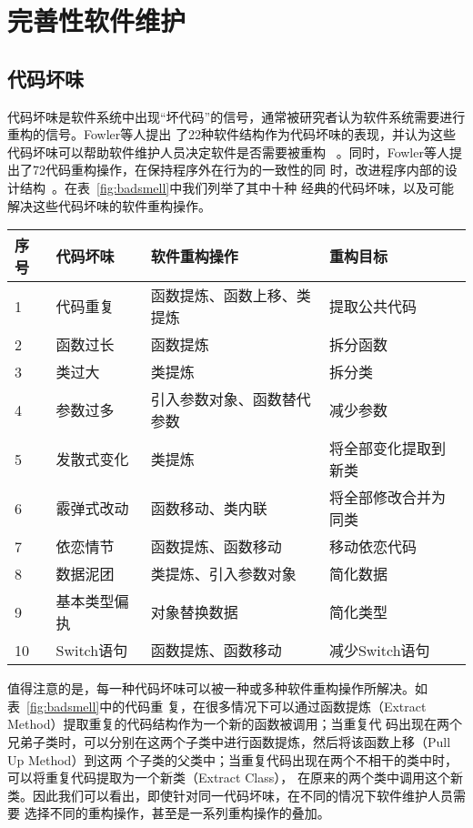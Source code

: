 \section{完善性软件维护}

\subsection{代码坏味}
代码坏味是软件系统中出现``坏代码''的信号，通常被研究者认为软件系统需要进行重构的信号。Fowler等人提出
了22种软件结构作为代码坏味的表现，并认为这些代码坏味可以帮助软件维护人员决定软件是否需要被重构
~\cite{fowler1999refactoring}。同时，Fowler等人提出了72代码重构操作，在保持程序外在行为的一致性的同
时，改进程序内部的设计结构~\cite{fowler1999refactoring}。在表~\ref{fig:badsmell}中我们列举了其中十种
经典的代码坏味，以及可能解决这些代码坏味的软件重构操作。

\begin{center}
\label{fig:badsmell}
\begin{tabular}{|l|l|l|l|}
\hline
序号 & 代码坏味 & 软件重构操作 & 重构目标\\ \hline
1 & 代码重复 & 函数提炼、函数上移、类提炼 & 提取公共代码\\ \hline
2 & 函数过长 & 函数提炼 & 拆分函数\\ \hline
3 & 类过大 & 类提炼 & 拆分类\\ \hline
4 & 参数过多 & 引入参数对象、函数替代参数 & 减少参数\\ \hline
5 & 发散式变化& 类提炼 & 将全部变化提取到新类\\ \hline
6 & 霰弹式改动& 函数移动、类内联 & 将全部修改合并为同类\\ \hline
7 & 依恋情节& 函数提炼、函数移动 & 移动依恋代码\\ \hline
8 & 数据泥团& 类提炼、引入参数对象 & 简化数据\\ \hline
9 & 基本类型偏执& 对象替换数据 & 简化类型 \\ \hline
10 & Switch语句 & 函数提炼、函数移动 & 减少Switch语句\\ \hline
\end{tabular}
\end{center}

值得注意的是，每一种代码坏味可以被一种或多种软件重构操作所解决。如表~\ref{fig:badsmell}中的代码重
复，在很多情况下可以通过函数提炼（Extract Method）提取重复的代码结构作为一个新的函数被调用；当重复代
码出现在两个兄弟子类时，可以分别在这两个子类中进行函数提炼，然后将该函数上移（Pull Up Method）到这两
个子类的父类中；当重复代码出现在两个不相干的类中时，可以将重复代码提取为一个新类（Extract Class），
在原来的两个类中调用这个新类。因此我们可以看出，即使针对同一代码坏味，在不同的情况下软件维护人员需要
选择不同的重构操作，甚至是一系列重构操作的叠加。

